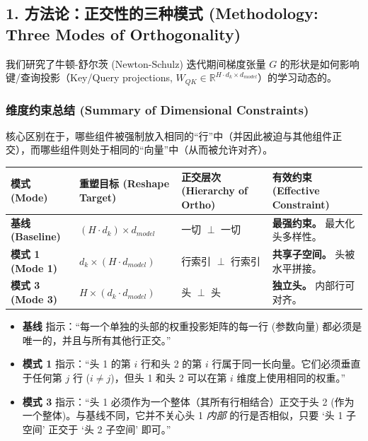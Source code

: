 \documentclass[12pt]{article}
\begin{document}
\subsection*{1. 方法论：正交性的三种模式 (Methodology: Three Modes of Orthogonality)}

我们研究了牛顿-舒尔茨 (Newton-Schulz) 迭代期间梯度张量 $G$ 的形状是如何影响键/查询投影（Key/Query projections, $W_{QK} \in \mathbb{R}^{H \cdot d_k \times d_{model}}$）的学习动态的。

\subsubsection*{维度约束总结 (Summary of Dimensional Constraints)}

核心区别在于，哪些组件被强制放入相同的“行”中（并因此被迫与其他组件正交），而哪些组件则处于相同的“向量”中（从而被允许对齐）。

\begin{table}[h]
\centering
\color{lighttext}
\begin{tabularx}{\textwidth}{l X X X}
\toprule
模式 (Mode) & 重塑目标 (Reshape Target) & 正交层次 (Hierarchy of Ortho) & 有效约束 (Effective Constraint) \\
\midrule
\textbf{基线 (Baseline)} & $(H \cdot d_k) \times d_{model}$ & 一切 $\perp$ 一切 & \textbf{最强约束。} 最大化头多样性。 \\
\textbf{模式 1 (Mode 1)} & $d_k \times (H \cdot d_{model})$ & 行索引 $\perp$ 行索引 & \textbf{共享子空间。} 头被水平拼接。 \\
\textbf{模式 3 (Mode 3)} & $H \times (d_k \cdot d_{model})$ & 头 $\perp$ 头 & \textbf{独立头。} 内部行可对齐。 \\
\bottomrule
\end{tabularx}
\end{table}

\begin{itemize}
    \item \textbf{基线} 指示：“每一个单独的头部的权重投影矩阵的每一行 (参数向量) 都必须是唯一的，并且与所有其他行正交。”
    \item \textbf{模式 1} 指示：“头 1 的第 $i$ 行和头 2 的第 $i$ 行属于同一长向量。它们必须垂直于任何第 $j$ 行 ($i \neq j$)，但头 1 和头 2 可以在第 $i$ 维度上使用相同的权重。”
    \item \textbf{模式 3} 指示：“头 1 必须作为一个整体（其所有行相结合）正交于头 2 (作为一个整体)。与基线不同，它并不关心头 1 \textit{内部} 的行是否相似，只要 ‘头 1 子空间’ 正交于 ‘头 2 子空间’ 即可。”
\end{itemize}
\end{document}

